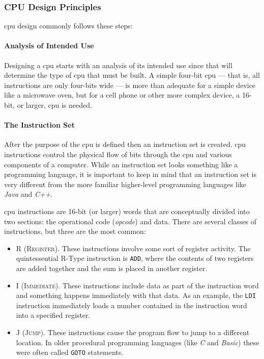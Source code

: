 \subsubsection{CPU Design Principles}

\gls{cpu} design commonly follows these steps:

\paragraph{Analysis of Intended Use} Designing a \gls{cpu} starts with an analysis of its intended use since that will determine the type of \gls{cpu} that must be built. A simple four-bit \gls{cpu} --- that is, all instructions are only four-bits wide --- is more than adequate for a simple device like a microwave oven, but for a cell phone or other more complex device, a 16-bit, or larger, \gls{cpu} is needed. 

\paragraph{The Instruction Set} After the purpose of the \gls{cpu} is defined then an instruction set is created. \gls{cpu} instructions control the physical flow of bits through the \gls{cpu} and various components of a computer. While an instruction set looks something like a programming language, it is important to keep in mind that an instruction set is very different from the more familiar higher-level programming languages like \emph{Java} and \emph{C++}.

\gls{cpu} instructions are 16-bit (or larger) words that are conceptually divided into two sections: the operational code (\emph{opcode}) and data. There are several classes of instructions, but three are the most common: 

\begin{itemize}
  \item \textsc{R (Register)}. These instructions involve some sort of register activity. The quintessential R-Type instruction is \lstinline[columns=fixed]|ADD|, where the contents of two registers are added together and the sum is placed in another register.
  \item \textsc{I (Immediate)}. These instructions include data as part of the instruction word and something happens immediately with that data. As an example, the \lstinline[columns=fixed]|LDI| instruction immediately loads a number contained in the instruction word into a specified register.
  \item \textsc{J (Jump)}. These instructions cause the program flow to jump to a different location. In older procedural programming languages (like \emph{C} and \emph{Basic}) these were often called \lstinline[columns=fixed]|GOTO| statements.
\end{itemize}

